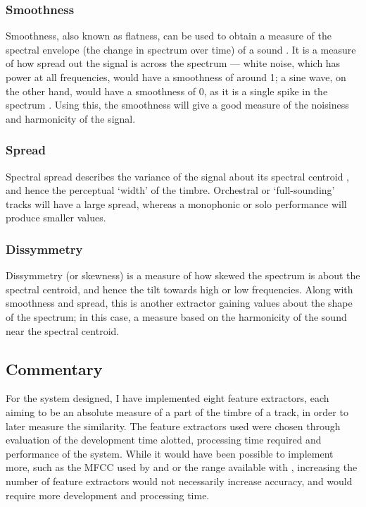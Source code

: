 \subsubsection{Smoothness}

Smoothness, also known as flatness, can be used to obtain a measure of the spectral envelope (the change in spectrum over time) of a sound \citep{Klapuri2003}. It is a measure of how spread out the signal is across the spectrum --- white noise, which has power at all frequencies, would have a smoothness of around 1; a sine wave, on the other hand, would have a smoothness of 0, as it is a single spike in the spectrum \citep{Peeters2004}. Using this, the smoothness will give a good measure of the noisiness and harmonicity of the signal.
\subsubsection{Spread}

Spectral spread describes the variance of the signal about its spectral centroid \citep{Peeters2004}, and hence the perceptual `width' of the timbre. Orchestral or `full-sounding' tracks will have a large spread, whereas a monophonic or solo performance will produce smaller values.
\subsubsection{Dissymmetry}

Dissymmetry (or skewness) is a measure of how skewed the spectrum is about the spectral centroid, and hence the tilt towards high or low frequencies. Along with smoothness and spread, this is another extractor gaining values about the shape of the spectrum; in this case, a measure based on the harmonicity of the sound near the spectral centroid.
\subsection{Commentary}
For the system designed, I have implemented eight feature extractors, each aiming to be an absolute measure of a part of the timbre of a track, in order to later measure the similarity. The feature extractors used were chosen through evaluation of the development time alotted, processing time required and performance of the system. While it would have been possible to implement more, such as the MFCC used by \citet{Schnitzer2003} and \citet{Aucouturier2002a} or the range available with , increasing the number of feature extractors would not necessarily increase accuracy, and would require more development and processing time.
